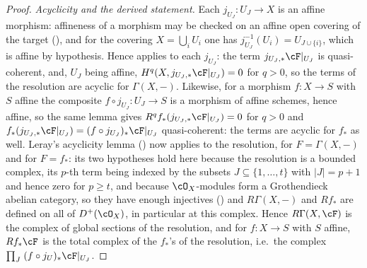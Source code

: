\begin{proof}
\emph{Acyclicity and the derived statement.}  Each $j_{U_J}:U_J\to X$
is an affine morphism: affineness of a morphism may be checked on an
affine open covering of the target
(), and for the covering
$X=\bigcup_iU_i$ one has $j_{U_J}^{-1}(U_i)=U_{J\cup\{i\}}$, which is
affine by hypothesis.  Hence
 applies to each $j_{U_J}$: the
term $j_{U_J,*}\cF|_{U_J}$ is quasi-coherent, and, $U_J$ being affine,
$H^q(X,j_{U_J,*}\cF|_{U_J})=0$ for $q>0$, so the terms of the
resolution are acyclic for $\Gamma(X,-)$.  Likewise, for a morphism
$f:X\to S$ with $S$ affine the composite $f\circ j_{U_J}:U_J\to S$ is a
morphism of affine schemes, hence affine, so the same lemma gives
$R^qf_*(j_{U_J,*}\cF|_{U_J})=0$ for $q>0$ and
$f_*(j_{U_J,*}\cF|_{U_J})=(f\circ j_{U_J})_*\cF|_{U_J}$ quasi-coherent:
the terms are acyclic for $f_*$ as well.  Leray's acyclicity lemma
() now applies to the resolution, for
$F=\Gamma(X,-)$ and for $F=f_*$: its two hypotheses hold here because
the resolution is a bounded complex, its $p$-th term being indexed by
the subsets $J\subseteq\{1,\dots,t\}$ with $|J|=p+1$ and hence zero for
$p\ge t$, and because $\cO_X$-modules form a Grothendieck abelian
category, so they have enough injectives
() and $R\Gamma(X,-)$ and
$Rf_*$ are defined on all of $D^+(\cO_X)$, in particular at this
complex.  Hence $R\Gamma(X,\cF)$ is the complex of global sections of
the resolution, and for $f:X\to S$ with $S$ affine, $Rf_*\cF$ is the
total complex of the $f_*$'s of the resolution, i.e.\ the complex
$\prod_J\;(f\circ j_{U})_*\cF|_{U_J}$.
\end{proof}

